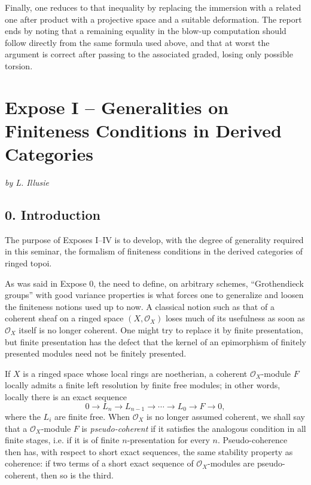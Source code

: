 \documentclass[14pt]{extarticle}
\newcommand{\cO}{\mathcal O}
\begin{document}
Finally, one reduces to that inequality by replacing the immersion with a related one after product with a projective space and a suitable deformation. The report ends by noting that a remaining equality in the blow-up computation should follow directly from the same formula used above, and that at worst the argument is correct after passing to the associated graded, losing only possible torsion.


\clearpage
\section{Expose I -- Generalities on Finiteness Conditions in Derived Categories}
\begin{center}
\emph{by L. Illusie}
\end{center}

\subsection*{0. Introduction}

The purpose of Exposes I--IV is to develop, with the degree of generality required in this seminar, the formalism of finiteness conditions in the derived categories of ringed topoi.

As was said in Expose 0, the need to define, on arbitrary schemes, ``Grothendieck groups'' with good variance properties is what forces one to generalize and loosen the finiteness notions used up to now. A classical notion such as that of a coherent sheaf on a ringed space $(X,\cO_X)$ loses much of its usefulness as soon as $\cO_X$ itself is no longer coherent. One might try to replace it by finite presentation, but finite presentation has the defect that the kernel of an epimorphism of finitely presented modules need not be finitely presented.

If $X$ is a ringed space whose local rings are noetherian, a coherent $\cO_X$-module $F$ locally admits a finite left resolution by finite free modules; in other words, locally there is an exact sequence
\[
0\longrightarrow L_n\longrightarrow L_{n-1}\longrightarrow\cdots\longrightarrow L_0\longrightarrow F\longrightarrow0,
\]
where the $L_i$ are finite free. When $\cO_X$ is no longer assumed coherent, we shall say that a $\cO_X$-module $F$ is \emph{pseudo-coherent} if it satisfies the analogous condition in all finite stages, i.e. if it is of finite $n$-presentation for every $n$. Pseudo-coherence then has, with respect to short exact sequences, the same stability property as coherence: if two terms of a short exact sequence of $\cO_X$-modules are pseudo-coherent, then so is the third.
\end{document}
